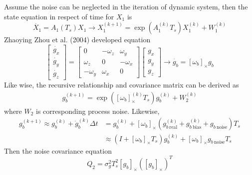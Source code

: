 \documentclass[12pt]{article}
\begin{document}
    Assume the noise can be neglected in the iteration of dynamic system, then the state equation in respect of time for $X_1$ is
    \begin{equation}
        \dot{X_1} = A_1(T_s) X_1 \rightarrow X_1^{(k+1)} = \exp \left( A_1^{(k)} T_s \right) X_1^{(k)} + W_1^{(k)}
    \end{equation}
    Zhaoying Zhou et al. (2004) developed equation
    \begin{equation}
        \begin{bmatrix}
            \dot{g_x} \\ \dot{g_y} \\ \dot{g_z} 
        \end{bmatrix} = \begin{bmatrix}
            0 & -\omega_z & \omega_y \\
            \omega_z & 0 & -\omega_x \\
            -\omega_y & \omega_x & 0 
        \end{bmatrix} \begin{bmatrix}
            g_x \\ g_y \\ g_z
        \end{bmatrix} \longrightarrow \dot{g_b} = [\omega_b]_\times g_b
    \end{equation}
    Like wise, the recursive relationship and covariance matrix can be derived as
    \begin{equation}
    \begin{aligned}
        g_b^{(k+1)} = \exp \left([\omega_b]_{\times}^{(k)} T_s \right) g_b^{(k)} + W_2^{(k)}
    \end{aligned}
    \end{equation}
    where $W_2$ is corresponding process noise. Likewise, 
    \begin{equation}
    \begin{aligned}
        g_b^{(k+1)} \approx g_b^{(k)} + \dot{g}_b^{(k)} \Delta t &= g_b^{(k)} + [\omega_b]_{\times} (g_{b~\text{real}}^{(k)} + g_{b~\text{bias}}^{(k)} + g_{b~\text{noise}}) T_s \\
        &\approx (I + [\omega_b]_{\times} T_s)g_b^{(k)} + [\omega_b]_{\times} g_{b~\text{noise}} T_s
    \end{aligned}
    \end{equation}
    Then the noise covariance equation
    \begin{equation}
        Q_2 = \sigma_{g}^2 T_s^2 [g_b]_{\times} \left( [g_b]_{\times} \right)^T
    \end{equation}
\end{document}
